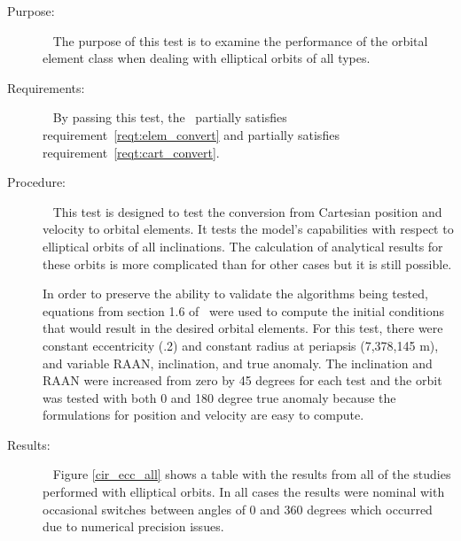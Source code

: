 \label{test:circ_ell_per}
\begin{description}
\item[Purpose:] \ \newline
The purpose of this test is to examine the performance of the orbital element
class when dealing with elliptical orbits of all types.
\item[Requirements:] \ \newline
By passing this test, the \OrbitalElement\ partially satisfies
requirement~\ref{reqt:elem_convert} and partially satisfies
requirement~\ref{reqt:cart_convert}.
\item[Procedure:]\ \newline
This test is designed to test the conversion from Cartesian position and
velocity to orbital elements.  It tests the model's capabilities with respect
to elliptical orbits of all inclinations.  The calculation of analytical
results for these orbits is more complicated than for other cases but it
is still possible.

In order to preserve the ability to validate the algorithms being tested,
equations from section 1.6 of~\cite{BMW} were used to compute the initial
conditions that would result in the desired orbital elements.  For this test,
there were constant eccentricity (.2) and constant radius at periapsis
(7,378,145 m), and variable RAAN, inclination, and true anomaly.  The
inclination and RAAN were increased from zero by 45 degrees for each test
and the orbit was tested with both 0 and 180 degree true anomaly because
the formulations for position and velocity are easy to compute.
\item[Results:]\ \newline
Figure \ref{cir_ecc_all} shows a table with the results from all of the studies
performed with elliptical orbits.  In all cases the results were nominal with
occasional switches between angles of 0 and 360 degrees which occurred due to
numerical precision issues.


\end{description}
